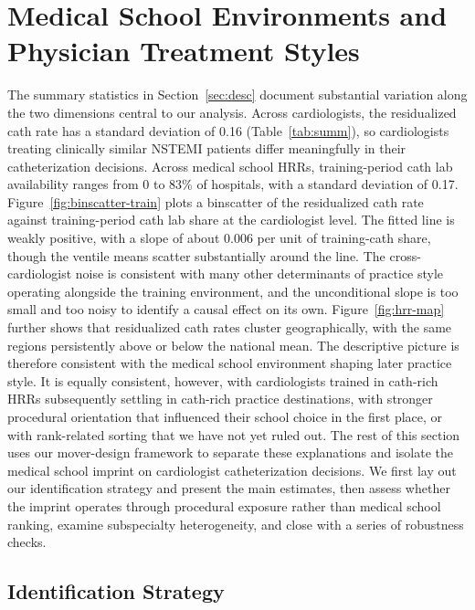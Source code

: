 \documentclass[12pt]{article}
\begin{document}
\section{Medical School Environments and Physician Treatment Styles}\label{sec:imprint}

The summary statistics in Section~\ref{sec:desc} document substantial variation along the two dimensions central to our analysis. Across cardiologists, the residualized cath rate has a standard deviation of 0.16 (Table~\ref{tab:summ}), so cardiologists treating clinically similar NSTEMI patients differ meaningfully in their catheterization decisions. Across medical school HRRs, training-period cath lab availability ranges from 0 to 83\% of hospitals, with a standard deviation of 0.17. Figure~\ref{fig:binscatter-train} plots a binscatter of the residualized cath rate against training-period cath lab share at the cardiologist level. The fitted line is weakly positive, with a slope of about 0.006 per unit of training-cath share, though the ventile means scatter substantially around the line. The cross-cardiologist noise is consistent with many other determinants of practice style operating alongside the training environment, and the unconditional slope is too small and too noisy to identify a causal effect on its own. Figure~\ref{fig:hrr-map} further shows that residualized cath rates cluster geographically, with the same regions persistently above or below the national mean. The descriptive picture is therefore consistent with the medical school environment shaping later practice style. It is equally consistent, however, with cardiologists trained in cath-rich HRRs subsequently settling in cath-rich practice destinations, with stronger procedural orientation that influenced their school choice in the first place, or with rank-related sorting that we have not yet ruled out. The rest of this section uses our mover-design framework to separate these explanations and isolate the medical school imprint on cardiologist catheterization decisions. We first lay out our identification strategy and present the main estimates, then assess whether the imprint operates through procedural exposure rather than medical school ranking, examine subspecialty heterogeneity, and close with a series of robustness checks.

\subsection{Identification Strategy}\label{sec:imprint-id}
\end{document}

